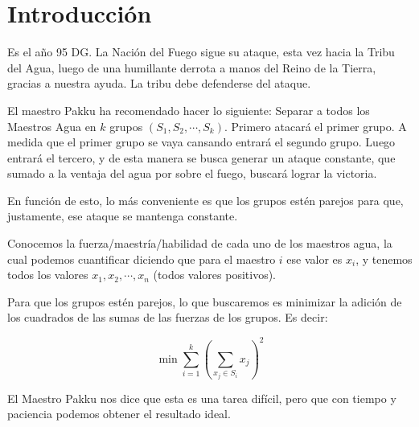 \section{Introducción}

Es el año 95 DG. La Nación del Fuego sigue su ataque, esta vez hacia la Tribu del Agua,
luego de una humillante derrota a manos del Reino de la Tierra, gracias a nuestra ayuda.
La tribu debe defenderse del ataque.

El maestro Pakku ha recomendado hacer lo siguiente: Separar a todos los Maestros Agua en 
$k$ grupos $(S_{1},S_{2},\cdots ,S_{k})$. Primero atacará el primer grupo. A medida que el primer
grupo se vaya cansando entrará el segundo grupo. Luego entrará el tercero, y de esta manera
se busca generar un ataque constante, que sumado a la ventaja del agua por sobre el fuego,
buscará lograr la victoria.

En función de esto, lo más conveniente es que los grupos estén parejos para que, justamente,
ese ataque se mantenga constante.

Conocemos la fuerza/maestría/habilidad de cada uno de los maestros agua, la cual podemos
cuantificar diciendo que para el maestro $i$ ese valor es $x_{i}$, y tenemos todos los
valores $x_{1},x_{2},\cdots ,x_{n}$ (todos valores positivos).

Para que los grupos estén parejos, lo que buscaremos es minimizar la adición de los cuadrados
de las sumas de las fuerzas de los grupos. Es decir:

\[
\min\sum_{i=1}^{k}\left( \sum_{x_{j}\in S_{i}}^{}x_{j} \right)^{2}
\]
 
El Maestro Pakku nos dice que esta es una tarea difícil, pero que con tiempo y paciencia podemos
obtener el resultado ideal.